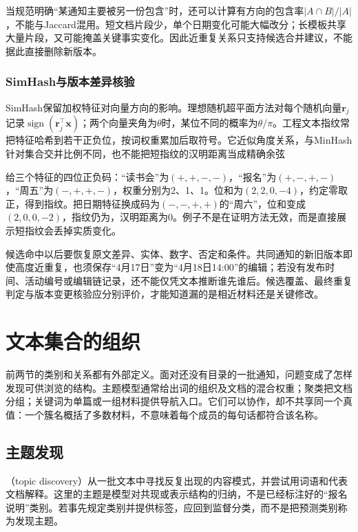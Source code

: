 当规范明确“某通知主要被另一份包含”时，还可以计算有方向的包含率$|A\cap B|/|A|$，不能与Jaccard混用。短文档片段少，单个日期变化可能大幅改分；长模板共享大量片段，又可能掩盖关键事实变化。因此近重复关系只支持候选合并建议，不能据此直接删除新版本。

\subsubsection{SimHash与版本差异核验}
\label{sec:nlp-classification-simhash}

SimHash保留加权特征对向量方向的影响。理想随机超平面方法对每个随机向量$\bm r_j$记录$\operatorname{sign}(\bm r_j^\top\bm x)$；两个向量夹角为$\theta$时，某位不同的概率为$\theta/\pi$。工程文本指纹常把特征哈希到若干正负位，按词权重累加后取符号。它近似角度关系，与MinHash针对集合交并比例不同，也不能把短指纹的汉明距离当成精确余弦

给三个特征的四位正负码：“读书会”为$(+,+,-,-)$，“报名”为$(+,-,+,-)$，“周五”为$(-,+,+,-)$，权重分别为2、1、1。位和为$(2,2,0,-4)$，约定零取正，得到指纹。把日期特征换成码为$(-,-,+,+)$的“周六”，位和变成$(2,0,0,-2)$，指纹仍为，汉明距离为0。例子不是在证明方法无效，而是直接展示短指纹会丢掉实质变化。

候选命中以后要恢复原文差异、实体、数字、否定和条件。共同通知的新旧版本即使高度近重复，也须保存“4月17日”变为“4月18日14:00”的编辑；若没有发布时间、活动编号或编辑链记录，还不能仅凭文本推断谁先谁后。候选覆盖、最终重复判定与版本变更核验应分别评价，才能知道漏的是相近材料还是关键修改。

\section{文本集合的组织}
\label{sec:nlp-classification-organization}

前两节的类别和关系都有外部定义。面对还没有目录的一批通知，问题变成了怎样发现可供浏览的结构。主题模型通常给出词的组织及文档的混合权重；聚类把文档分组；关键词为单篇或一组材料提供导航入口。它们可以协作，却不共享同一个真值：一个簇名概括了多数材料，不意味着每个成员的每句话都符合该名称。

\subsection{主题发现}
\label{sec:nlp-classification-topics}

（topic discovery）从一批文本中寻找反复出现的内容模式，并尝试用词语和代表文档解释。这里的主题是模型对共现或表示结构的归纳，不是已经标注好的“报名说明”类别。若事先规定类别并提供标签，应回到监督分类，而不是把预测类别称为发现主题。

